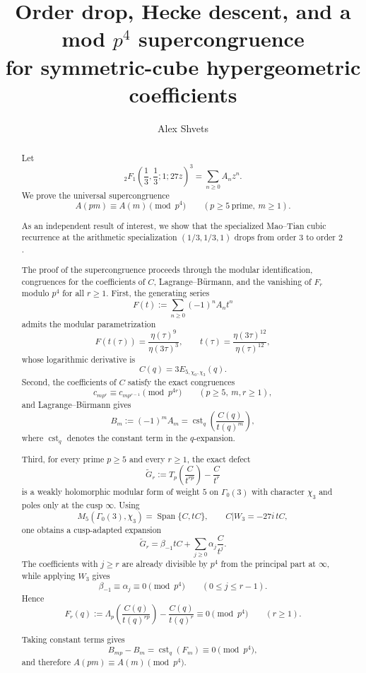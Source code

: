 \documentclass[11pt]{amsart}
\theoremstyle{remark}
\DeclareMathOperator{\Span}{Span}
\DeclareMathOperator{\cst}{cst}
\begin{document}
\title[Sym$^3$ mod $p^4$ supercongruence]{Order drop, Hecke descent, and a mod $p^4$ supercongruence\\
for symmetric-cube hypergeometric coefficients}

\author{Alex Shvets}
\address{Haifa, Israel}

\begin{abstract}
Let
\[
{}_2F_1\!\left(\frac13,\frac13;1;27z\right)^3=\sum_{n\ge0}A_n z^n.
\]
We prove the universal supercongruence
\[
A(pm)\equiv A(m)\pmod{p^4}
\qquad (p\ge5\ \text{prime},\ m\ge1).
\]

As an independent result of interest, we show that the specialized Mao--Tian cubic recurrence at the
arithmetic specialization $(1/3,1/3,1)$ drops from order $3$ to order $2$.

The proof of the supercongruence proceeds through the modular identification, congruences for the
coefficients of $C$, Lagrange--B\"urmann, and the vanishing of $F_r$ modulo $p^4$ for all $r\ge1$.
First, the generating series
\[
F(t):=\sum_{n\ge0}(-1)^nA_nt^n
\]
admits the modular parametrization
\[
F(t(\tau))=\frac{\eta(\tau)^9}{\eta(3\tau)^3},
\qquad
t(\tau)=\frac{\eta(3\tau)^{12}}{\eta(\tau)^{12}},
\]
whose logarithmic derivative is
\[
C(q)=3E_{5,\chi_0,\chi_3}(q).
\]
Second, the coefficients of $C$ satisfy the exact congruences
\[
c_{mp^r}\equiv c_{mp^{r-1}}\pmod{p^{4r}}
\qquad (p\ge5,\ m,r\ge1),
\]
and Lagrange--B\"urmann gives
\[
B_m:=(-1)^mA_m=\cst_q\!\left(\frac{C(q)}{t(q)^m}\right),
\]
where $\cst_q$ denotes the constant term in the $q$-expansion.

Third, for every prime $p\ge5$ and every $r\ge1$, the exact defect
\[
\widetilde G_r:=T_p\!\left(\frac{C}{t^{rp}}\right)-\frac{C}{t^r}
\]
is a weakly holomorphic modular form of weight $5$ on $\Gamma_0(3)$ with character $\chi_3$ and poles
only at the cusp $\infty$. Using
\[
M_5(\Gamma_0(3),\chi_3)=\Span\{C,tC\},
\qquad
C|W_3=-27i\,tC,
\]
one obtains a cusp-adapted expansion
\[
\widetilde G_r=\beta_{-1}tC+\sum_{j\ge0}\alpha_j\frac{C}{t^j}.
\]
The coefficients with $j\ge r$ are already divisible by $p^4$ from the principal part at
$\infty$, while applying $W_3$ gives
\[
\beta_{-1}\equiv \alpha_j\equiv0\pmod{p^4}
\qquad (0\le j\le r-1).
\]
Hence
\[
F_r(q):=\Lambda_p\!\left(\frac{C(q)}{t(q)^{rp}}\right)-\frac{C(q)}{t(q)^r}\equiv0\pmod{p^4}
\qquad (r\ge1).
\]

Taking constant terms gives
\[
B_{mp}-B_m=\cst_q(F_m)\equiv0\pmod{p^4},
\]
and therefore $A(pm)\equiv A(m)\pmod{p^4}$.
\end{abstract}
\end{document}
